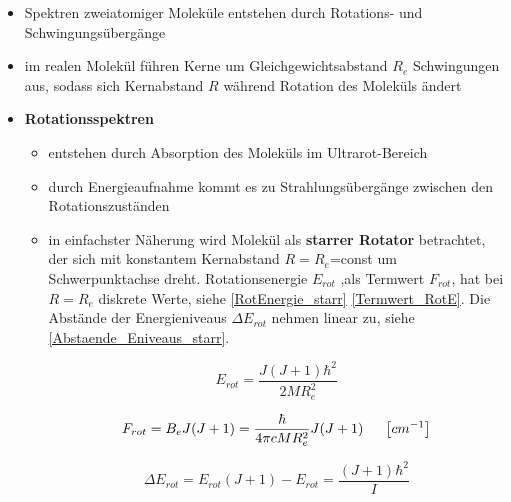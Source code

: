 \label{q:43}
\begin{itemize}
    \item Spektren zweiatomiger Moleküle entstehen durch Rotations- und Schwingungsübergänge
    \item im realen Molekül führen Kerne um Gleichgewichtsabstand $R_e$ Schwingungen aus, sodass sich Kernabstand $R$ während Rotation des Moleküls ändert
    \item \textbf{Rotationsspektren}
        \begin{itemize}
            \item entstehen durch Absorption des Moleküls im Ultrarot-Bereich
            \item durch Energieaufnahme kommt es zu Strahlungsübergänge zwischen den Rotationszuständen
            \item in einfachster Näherung wird Molekül als \textbf{starrer Rotator} betrachtet, der sich mit konstantem Kernabstand $R=R_e$=const um Schwerpunktachse dreht. Rotationsenergie $E_{rot}$ ,als Termwert $F_{rot}$, hat bei $R=R_e$ diskrete Werte, siehe \ref{RotEnergie_starr} \ref{Termwert_RotE}. Die Abstände der Energieniveaus $\Delta E_{rot}$ nehmen linear zu, siehe \ref{Abstaende_Eniveaus_starr}.

                \begin{equation}
                E_{rot} = \frac{J(J+1)\hbar^2}{2MR_e^2}
                \label{RotEnergie_starr}
                \end{equation}

                \begin{equation}
                F_{rot} =B_eJ(J+1)=\frac{\hbar}{4\pi cMR_e^2}J(J+1) \hspace{5mm} \left[cm^{-1}\right]
                \label{Termwert_RotE}
                \end{equation}

                \begin{equation}
                \Delta E_{rot}=E_{rot}(J+1)-E_{rot}=\frac{(J+1)\hbar^2}{I}
                \label{Abstaende_Eniveaus_starr}
                \end{equation}


\end{itemize}
\end{itemize}
